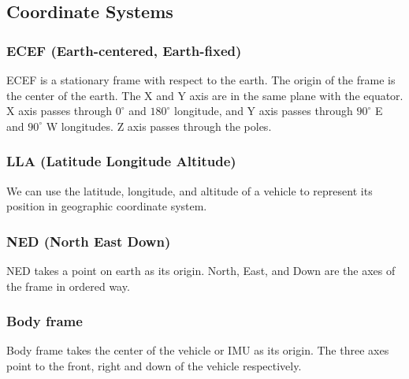 \documentclass[12pt]{article}
\begin{document}
    \subsection{Coordinate Systems}

    \subsubsection{ECEF (Earth-centered, Earth-fixed)}
    ECEF is a stationary frame with respect to the earth. The origin of the 
    frame is the center of the earth. The X and Y axis are in the same plane 
    with the equator. X axis passes through \(0^{\circ}\) and \(180^{\circ}\) longitude, 
    and Y axis passes through \(90^{\circ}\) E and \(90^{\circ}\) W longitudes. 
    Z axis passes through the poles.
    
    \subsubsection{LLA (Latitude Longitude Altitude)}
    We can use the latitude, longitude, and altitude of a vehicle to represent 
    its position in geographic coordinate system.
    
    \subsubsection{NED (North East Down)}
    NED takes a point on earth as its origin. North, East, and Down are the axes 
    of the frame in ordered way.

    \subsubsection{Body frame}
    Body frame takes the center of the vehicle or IMU as its origin. The three axes 
    point to the front, right and down of the vehicle respectively.
\end{document}
